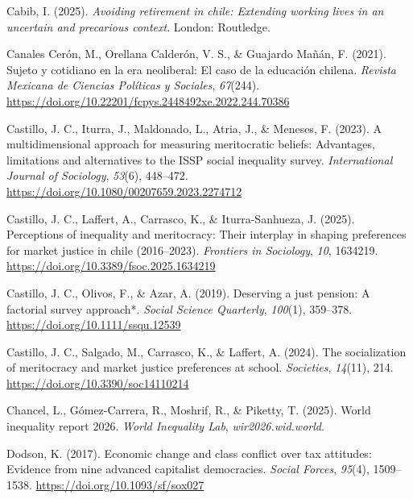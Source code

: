 \documentclass[
  12pt,
]{article}
\newlength{\cslhangindent}
\newenvironment{CSLReferences}[2] %
 {\begin{list}{}{%
  \setlength{\itemindent}{0pt}
  \setlength{\leftmargin}{0pt}
  \setlength{\parsep}{0pt}
  \ifodd #1
   \setlength{\leftmargin}{\cslhangindent}
   \setlength{\itemindent}{-1\cslhangindent}
  \fi
  \setlength{\itemsep}{#2\baselineskip}}}
 {\end{list}}
\begin{document}
\begin{CSLReferences}{1}{0}
Cabib, I. (2025). \emph{Avoiding retirement in chile: Extending working
lives in an uncertain and precarious context}. London: Routledge.

Canales Cerón, M., Orellana Calderón, V. S., \& Guajardo Mañán, F.
(2021). Sujeto y cotidiano en la era neoliberal: El caso de la educación
chilena. \emph{Revista Mexicana de Ciencias Políticas y Sociales},
\emph{67}(244).
\url{https://doi.org/10.22201/fcpys.2448492xe.2022.244.70386}

Castillo, J. C., Iturra, J., Maldonado, L., Atria, J., \& Meneses, F.
(2023). A multidimensional approach for measuring meritocratic beliefs:
Advantages, limitations and alternatives to the ISSP social inequality
survey. \emph{International Journal of Sociology}, \emph{53}(6),
448--472. \url{https://doi.org/10.1080/00207659.2023.2274712}

Castillo, J. C., Laffert, A., Carrasco, K., \& Iturra-Sanhueza, J.
(2025). Perceptions of inequality and meritocracy: Their interplay in
shaping preferences for market justice in chile (2016--2023).
\emph{Frontiers in Sociology}, \emph{10}, 1634219.
\url{https://doi.org/10.3389/fsoc.2025.1634219}

Castillo, J. C., Olivos, F., \& Azar, A. (2019). Deserving a just
pension: A factorial survey approach*. \emph{Social Science Quarterly},
\emph{100}(1), 359--378. \url{https://doi.org/10.1111/ssqu.12539}

Castillo, J. C., Salgado, M., Carrasco, K., \& Laffert, A. (2024). The
socialization of meritocracy and market justice preferences at school.
\emph{Societies}, \emph{14}(11), 214.
\url{https://doi.org/10.3390/soc14110214}

Chancel, L., Gómez-Carrera, R., Moshrif, R., \& Piketty, T. (2025).
World inequality report 2026. \emph{World Inequality Lab},
\emph{wir2026.wid.world}.

Dodson, K. (2017). Economic change and class conflict over tax
attitudes: Evidence from nine advanced capitalist democracies.
\emph{Social Forces}, \emph{95}(4), 1509--1538.
\url{https://doi.org/10.1093/sf/sox027}


\end{CSLReferences}
\end{document}
